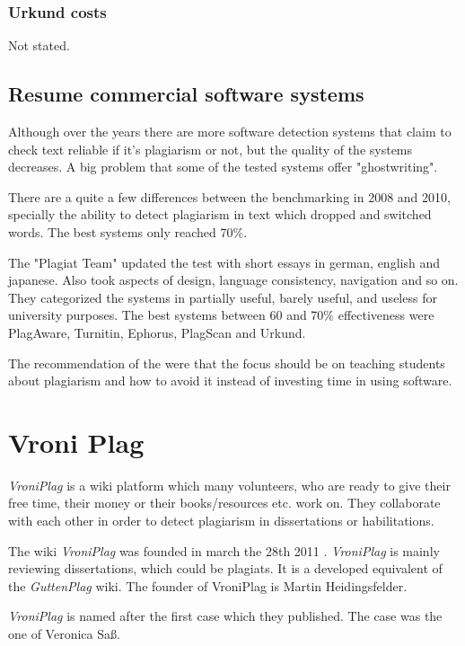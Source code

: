 \subsubsection{Urkund costs}
Not stated.


\newpage

\subsection{Resume commercial software systems}

Although over the years there are more software detection systems that claim to check text reliable if it's plagiarism or not, but the quality of the systems decreases. 
A big problem that some of the tested systems offer "ghostwriting".

There are a quite a few differences between the benchmarking in 2008 and 2010, specially the ability to detect plagiarism in text which dropped and switched words. The best systems only reached 70\%.

The "Plagiat Team" updated the test with short essays in german, english and japanese.
Also took aspects of design, language consistency, navigation and so on.
They  categorized the systems in partially useful, barely useful, and useless for university purposes. The best systems between 60 and 70\% effectiveness were PlagAware, Turnitin, Ephorus, PlagScan and Urkund. \citep{PlagiatTeam} 

The recommendation of  the \citet{PlagiatTeam} were that the focus should be on teaching students about plagiarism and how to avoid it instead of investing time in using software. 


\section{Vroni Plag}
\textit{VroniPlag}  is a wiki platform which many volunteers, who are ready to give their free time, their money or 
their books/resources etc. work on. They collaborate with each other in order to detect plagiarism in dissertations or
habilitations.

The wiki \textit{VroniPlag} was founded in march the 28th 2011 . \textit{VroniPlag}  is mainly reviewing dissertations, which could be plagiats. It is a developed equivalent of the \textit{GuttenPlag} wiki. The founder of VroniPlag is Martin Heidingsfelder.
\citep{Wikipedia}


\textit{VroniPlag} is named after the first case which they published. The case was the one of Veronica Saß.

